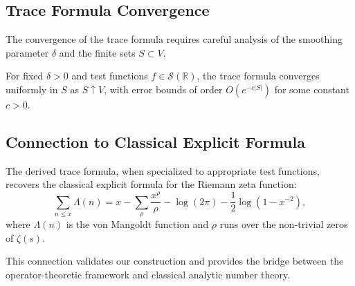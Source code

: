 \subsection{Trace Formula Convergence}

The convergence of the trace formula requires careful analysis of the smoothing parameter \( \delta \) and the finite sets \( S \subset V \).

\begin{theorem}
For fixed \( \delta > 0 \) and test functions \( f \in \mathcal{S}(\mathbb{R}) \), the trace formula converges uniformly in \( S \) as \( S \uparrow V \), with error bounds of order \( O(e^{-c|S|}) \) for some constant \( c > 0 \).
\end{theorem}

\subsection{Connection to Classical Explicit Formula}

The derived trace formula, when specialized to appropriate test functions, recovers the classical explicit formula for the Riemann zeta function:
\[
\sum_{n \leq x} \Lambda(n) = x - \sum_{\rho} \frac{x^\rho}{\rho} - \log(2\pi) - \frac{1}{2}\log(1-x^{-2}),
\]
where \( \Lambda(n) \) is the von Mangoldt function and \( \rho \) runs over the non-trivial zeros of \( \zeta(s) \).

This connection validates our construction and provides the bridge between the operator-theoretic framework and classical analytic number theory.